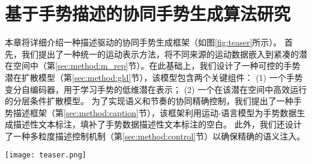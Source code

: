 
\chapter{基于手势描述的协同手势生成算法研究}
\label{sec:GG} 
本章将详细介绍一种描述驱动的协同手势生成框架（如图\ref{fig:teaser}所示）。
首先，我们提出了一种统一的运动表示方法，将不同来源的运动数据嵌入到紧凑的潜在空间中（第\ref{sec:method:m_rep}节）。在此基础上，我们设计了一种可控的手势潜在扩散模型（第\ref{sec:method:gld}节），该模型包含两个关键组件：
(1) 一个手势变分自编码器，用于学习手势的低维潜在表示；
(2) 一个在该潜在空间中高效运行的分层条件扩散模型。
为了实现语义和节奏的协同精确控制，我们提出了一种手势描述框架（第\ref{sec:method:caption}节），该框架利用运动-语言模型为手势数据生成描述性文本标注，填补了手势数据描述性文本标注的空白。
此外，我们还设计了一种多粒度描述控制机制（第\ref{sec:method:control}节）以确保精确的语义注入。

\begin{figure*}[!h]
  \centering
  \texttt{[image: teaser.png]}
  \caption{\textbf{CoordSpeaker} 支持 \textit{手势字幕} 和定制的 \textit{协同的说话者动作生成}，既能与字幕保持语义一致，又能与音频保持节奏同步。例如，在演讲场景中，我们的方法允许说话者在讲话时自然地向前走并鞠躬，无缝地做出结束手势。} %
  \label{fig:teaser}
\end{figure*}

